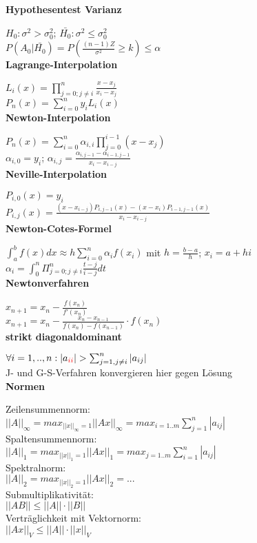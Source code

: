 \documentclass[10pt,twocolumn,a4paper]{article}
\begin{document}
\begin{flushleft}
\textbf{Hypothesentest Varianz}

$H_0: \sigma^2 > \sigma_0^2$; $\bar{H_0}: \sigma^2 \leq \sigma_0^2$\\
$P(A_0|\bar{H_0}) = P(\frac{(n-1)Z}{\sigma^2} \geq k) \leq \alpha$\\

\textbf{Lagrange-Interpolation}

$L_i(x) = \prod_{j=0;j \ne i}^n \frac{x-x_j}{x_i-x_j}$\\
$P_n(x) = \sum_{i=0}^n y_i L_i(x)$\\

\textbf{Newton-Interpolation}

$P_n(x) = \sum_{i=0}^n \alpha_{i,i} \prod_{j=0}^{i-1}(x-x_j)$\\
$\alpha_{i,0} = y_i$; $\alpha_{i,j} = \frac{\alpha_{i,j-1} - \alpha_{i-1,j-1}}{x_i - x_{i-j}}$\\

\textbf{Neville-Interpolation}

$P_{i,0}(x) = y_i$\\
$P_{i,j}(x) = \frac{(x-x_{i-j})P_{i,j-1}(x) - (x-x_i)P_{i-1,j-1}(x)}{x_i - x_{i-j}}$\\

\textbf{Newton-Cotes-Formel}

$\int_a^b f(x) dx \approx h \sum_{i=0}^n \alpha_i f(x_i)$ mit $h=\frac{b-a}{h}$; $x_i = a + hi$\\
$\alpha_i = \int_0^n \Pi_{j=0;j\neq i}^n \frac{t-j}{i-j} dt$\\

\textbf{Newtonverfahren}

$x_{n+1} = x_n - \frac{f(x_n)}{f'(x_n)}$\\
$x_{n+1} = x_n - \frac{x_n - x_{n-1}}{f(x_n) - f(x_{n-1})} \cdot f(x_n)$\\

\textbf{strikt diagonaldominant}

$\forall i = 1,..,n: |a_{\textcolor{red}{ii}}| > \sum_{j=1,j\neq i}^n |a_{ij}|$\\
J- und G-S-Verfahren konvergieren hier gegen Lösung\\

\textbf{Normen}

Zeilensummennorm:\\
$||A||_\infty = max_{||x||_\infty=1}||Ax||_\infty=max_{i=1..m}\sum_{j=1}^n |a_{ij}|$\\
Spaltensummennorm:\\
$||A||_1 = max_{||x||_1=1}||Ax||_1=max_{j=1..m}\sum_{i=1}^n |a_{ij}|$\\
Spektralnorm:\\
$||A||_2 = max_{||x||_2=1}||Ax||_2=...$\\
Submultiplikativität:\\
$||AB|| \leq ||A|| \cdot ||B||$\\
Verträglichkeit mit Vektornorm:\\
$||Ax||_V \leq ||A|| \cdot ||x||_V$\\



\end{flushleft}
\end{document}
